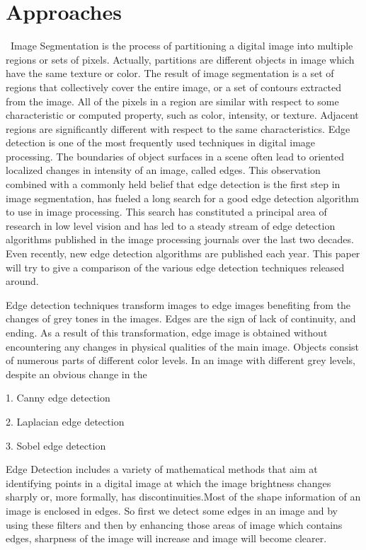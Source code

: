 \documentclass[BTech]{srmuthesis}
\begin{document}
\section{Approaches}
\ Image Segmentation \cite{researchgate_edge_det} is the process of partitioning a
digital image into multiple regions or sets of
pixels. Actually, partitions are different objects
in image which have the same texture or color. The result
of image segmentation is a set of regions that collectively
cover the entire image, or a set of contours extracted from
the image. All of the pixels in a region are similar with
respect to some characteristic or computed property, such
as color, intensity, or texture. Adjacent regions are
significantly different with respect to the same
characteristics. Edge detection is one of the most
frequently used techniques in digital image
processing. The boundaries of object surfaces in a
scene often lead to oriented localized changes in intensity
of an image, called edges. This observation combined
with a commonly held belief that edge detection is the
first step in image segmentation, has fueled a long search
for a good edge detection algorithm to use in image
processing. This search has constituted a principal
area of research in low level vision and has led to a
steady stream of edge detection algorithms published in
the image processing journals over the last two decades.
Even recently, new edge detection algorithms are
published each year. This paper will try to give a comparison of the various edge detection techniques released around.

Edge detection techniques transform images to edge
images benefiting from the changes of grey tones in the
images. Edges are the sign of lack of continuity, and
ending. As a result of this transformation, edge image is
obtained without encountering any changes in physical
qualities of the main image. Objects consist of
numerous parts of different color levels. In an image with
different grey levels, despite an obvious change in the 

1. Canny edge detection

2. Laplacian edge detection

3. Sobel edge detection

Edge Detection includes a variety of mathematical methods that aim at identifying points in a digital image at which the image brightness changes sharply or, more formally, has discontinuities.Most of the shape information of an image is enclosed in edges. So first we detect some edges in an image and by using these filters and then by enhancing those areas of image which contains edges, sharpness of the image will increase and image will become clearer.
\end{document}
